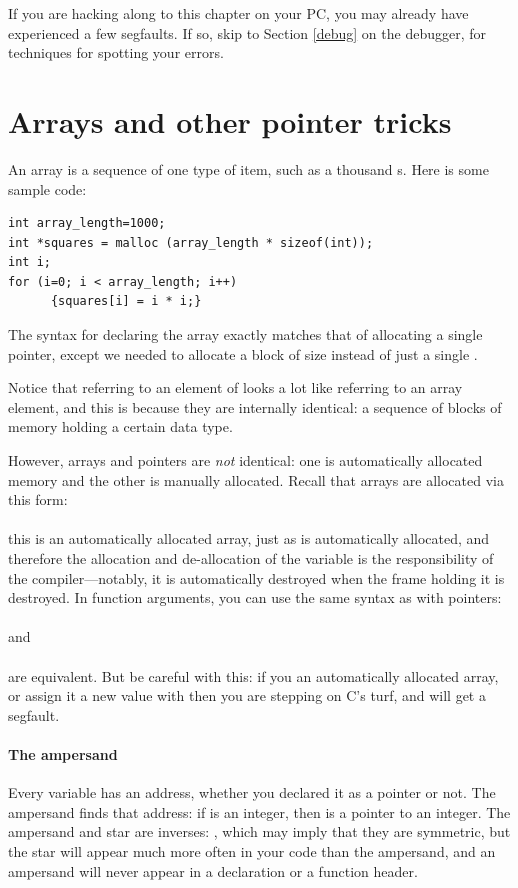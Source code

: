 \documentclass[12pt]{article}
\begin{document}
If you are hacking along to this chapter on your PC, you may already
have experienced a few segfaults. If so, skip to 
Section \ref{debug} on the debugger, for techniques for spotting your
errors.

\section{Arrays and other pointer tricks} \label{for_loops} 

An array is a sequence of one type of item, such as a thousand s. Here is some sample code:
\begin{lstlisting}
int array_length=1000;
int *squares = malloc (array_length * sizeof(int));
int i;
for (i=0; i < array_length; i++)
      {squares[i] = i * i;}
\end{lstlisting}
The syntax for declaring the array exactly match\-es that of allocating
a single pointer, except we need\-ed to allocate a block of size 
 instead of just a single . 

Notice that referring to an element of  looks a lot
like referring to an array element, and this is because they are
internally identical: a sequence of blocks of memory holding a certain
data type. 

However, arrays and pointers are {\em not} identical: one is
automatically allocated memory and the other is manually allocated.
Recall that arrays are allocated via this form:\\
\\
this is an automatically allocated array, just
as  is automatically allocated, and therefore
the allocation and de-allocation of the variable is the responsibility
of the compiler---notably, it is automatically destroyed when the frame
holding it is destroyed. In function arguments, you can use the same
syntax as with pointers: 
\\ \\
and
\\ \\
are equivalent.
But be careful with this: if you  an automatically allocated
array, or assign it a new value with  then you are stepping
on C's turf, and will get a segfault.

\paragraph{The ampersand}\index{\&} Every variable has an address, whether you
declared it as a pointer or not. The ampersand finds that address: if
 is an integer, then  is a pointer to an integer.
The ampersand and star are inverses: , which
may imply that they are symmetric, but the star will appear much more
often in your code than the ampersand, and 
an ampersand will never appear in a declaration or a function header.
\end{document}
